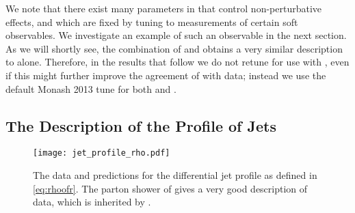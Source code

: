 
We note that there exist many parameters in \py that 
control non-perturbative effects, and which are fixed by 
tuning to measurements of certain soft observables. We investigate an example of such an observable in the next section. 
As we will shortly see, the combination of \HEJ and \py obtains a very similar description
to \py alone. Therefore, in the results that follow 
we do not retune \py for use with \HEJ, 
even if this might further improve the agreement of
\HEJpy with data; instead we use the default Monash 2013 tune \cite{Skands:2014pea}
for both \py and \HEJpy.

\subsection{The Description of the Profile of Jets}
\label{sec:jetprofiles}

\begin{figure}[thp]
  \centering
     \texttt{[image: jet\_profile\_rho.pdf]}
  \caption{The data and predictions for the differential jet profile as
    defined in \cref{eq:rhoofr}. The parton shower of \py gives a very good
    description of data, which is inherited by \HEJpy.}
  \label{fig:jetprofile}
\end{figure}

